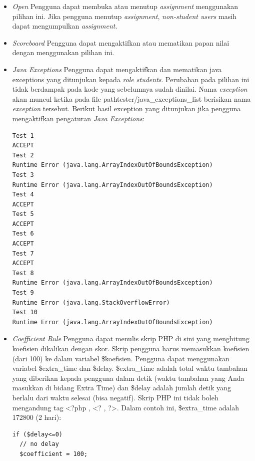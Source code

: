 \begin{itemize}
        \item \textit{Open} \newline
        Pengguna dapat membuka atau menutup \textit{assignment} menggunakan pilihan ini. Jika pengguna menutup \textit{assignment}, \textit{non-student users} masih dapat mengumpulkan \textit{assignment}. \\
        \item \textit{Scoreboard} \newline
        Pengguna dapat mengaktifkan atau mematikan papan nilai dengan menggunakan pilihan ini.
        \item \textit{Java Exceptions} \newline
        Pengguna dapat mengaktifkan dan mematikan java exceptions yang ditunjukan kepada \textit{role students}. Perubahan pada pilihan ini tidak berdampak pada kode yang sebelumnya sudah dinilai. Nama \textit{exception} akan muncul ketika pada file pathtester/java\_exceptions\_list berisikan nama \textit{exception} tersebut. Berikut hasil exception yang ditunjukan jika pengguna mengaktifkan pengaturan \textit{Java Exceptions}:
        
         \begin{lstlisting}[basicstyle=\ttfamily, frame=single,
    columns=fullflexible, breaklines=true, numbers=none]
Test 1
ACCEPT
Test 2
Runtime Error (java.lang.ArrayIndexOutOfBoundsException)
Test 3
Runtime Error (java.lang.ArrayIndexOutOfBoundsException)
Test 4
ACCEPT
Test 5
ACCEPT
Test 6
ACCEPT
Test 7
ACCEPT
Test 8
Runtime Error (java.lang.ArrayIndexOutOfBoundsException)
Test 9
Runtime Error (java.lang.StackOverflowError)
Test 10
Runtime Error (java.lang.ArrayIndexOutOfBoundsException)
    \end{lstlisting}

        \item \textit{Coefficient Rule} \newline
        Pengguna dapat menulis skrip PHP di sini yang menghitung koefisien dikalikan dengan skor. Skrip pengguna harus memasukkan koefisien (dari 100) ke dalam variabel \$koefisien. Pengguna dapat menggunakan variabel \$extra\_time dan \$delay. \$extra\_time adalah total waktu tambahan yang diberikan kepada pengguna dalam detik (waktu tambahan yang Anda masukkan di bidang Extra Time) dan \$delay adalah jumlah detik yang berlalu dari waktu selesai (bisa negatif). Skrip PHP ini tidak boleh mengandung tag <?php , <? , ?>. Dalam contoh ini, \$extra\_time adalah 172800 (2 hari): 
        
         \begin{lstlisting}[basicstyle=\ttfamily, frame=single,
    columns=fullflexible, breaklines=true, numbers=none]
if ($delay<=0)
  // no delay
  $coefficient = 100;


\end{lstlisting}
\end{itemize}
